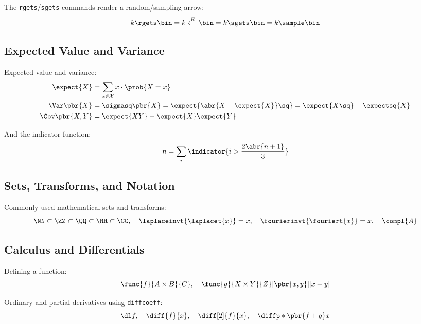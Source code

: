 The \texttt{rgets}/\texttt{sgets} commands render a random\-/sampling arrow:
\begin{equation*}
    k \rgets \bin = k \xleftarrow{R} \bin = k \sgets \bin = k \sample \bin
\end{equation*}

\subsection{Expected Value and Variance}

Expected value and variance:
\begin{align*}
    \expect{X}     &= \sum_{x \in \mathcal{X}} x \cdot \prob{X = x}                                     \\
    \Var\pbr{X}    &= \sigmasq\pbr{X} = \expect{\abr{X - \expect{X}}\sq} = \expect{X\sq} - \expectsq{X} \\
    \Cov\pbr{X, Y} &= \expect{XY} - \expect{X}\expect{Y}
\end{align*}

And the indicator function:
\begin{equation*}
    n = \sum_i \indicator{i > \frac{2\abr{n + 1}}{3}}
\end{equation*}

\subsection{Sets, Transforms, and Notation}

Commonly used mathematical sets and transforms:
\begin{equation*}
    \NN \subset \ZZ \subset \QQ \subset \RR \subset \CC,
    \quad \laplaceinvt{\laplacet{x}} = x,
    \quad \fourierinvt{\fouriert{x}} = x,
    \quad \compl{A}
\end{equation*}

\subsection{Calculus and Differentials}

Defining a function:
\begin{equation*}
    \func{f}{A \times B}{C},
    \quad \func{g}{X \times Y}{Z}[\pbr{x, y}][x + y]
\end{equation*}

Ordinary and partial derivatives using \texttt{diffcoeff}:
\begin{equation*}
    \dl f,
    \quad \diff{f}{x},
    \quad \diff[2]{f}{x},
    \quad \diffp*{\pbr{f + g}}{x}
\end{equation*}

